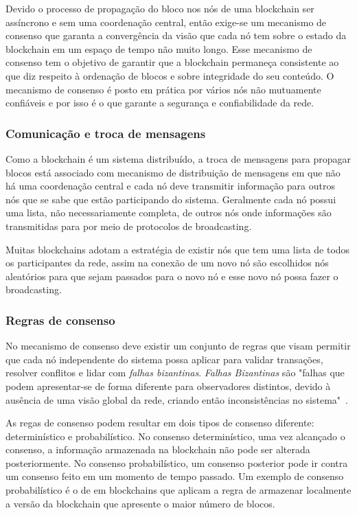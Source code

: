 \documentclass[12pt]{article}
\begin{document}
Devido o processo de propagação do bloco nos nós de uma blockchain ser assíncrono e sem uma coordenação central, então exige-se um mecanismo de consenso que garanta a convergência da visão que cada nó tem sobre o estado da blockchain em um espaço de tempo não muito longo. Esse mecanismo de consenso tem o objetivo de garantir que a blockchain permaneça consistente ao que diz respeito à ordenação de blocos e sobre integridade do seu conteúdo. O mecanismo de consenso é posto em prática por vários nós não mutuamente confiáveis e por isso é o que garante a segurança e confiabilidade da rede.

\subsubsection{Comunicação e troca de mensagens}

Como a blockchain é um sistema distribuído, a troca de mensagens para propagar blocos está associado com mecanismo de distribuição de mensagens em que não há uma coordenação central e cada nó deve transmitir informação para outros nós que se sabe que estão participando do sistema. Geralmente cada nó possui uma lista, não necessariamente completa, de outros nós onde informações são transmitidas para por meio de protocolos de broadcasting\cite{miers2019analise}.

Muitas blockchains adotam a estratégia de existir nós que tem uma lista de todos os participantes da rede, assim na conexão de um novo nó são escolhidos nós aleatórios para que sejam passados para o novo nó e esse novo nó possa fazer o broadcasting.

\subsubsection{Regras de consenso}

No mecanismo de consenso deve existir um conjunto de regras que visam permitir que cada nó independente do sistema possa aplicar para validar transações, resolver conflitos e lidar com \emph{falhas bizantinas}. \emph{Falhas Bizantinas} são "falhas que podem apresentar-se de forma diferente para observadores distintos, devido à ausência de uma visão global da rede, criando então inconsistências no sistema"~\cite{miers2019analise}.

As regas de consenso podem resultar em dois tipos de consenso diferente: determinístico e probabilístico. No consenso determinístico, uma vez alcançado o consenso, a informação armazenada na blockchain não pode ser alterada posteriormente. No consenso probabilístico, um consenso posterior pode ir contra um consenso feito em um momento de tempo passado. Um exemplo de consenso probabilístico é o de em blockchains que aplicam a regra de armazenar localmente a versão da blockchain que apresente o maior número de blocos.
\end{document}
